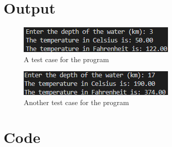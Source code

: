 \documentclass{article}
\begin{document}
\begin{flushleft}
  \section{Output}
  \begin{figure}[!h]
    \begin{centering}
      \includegraphics[scale=1]{Q2_output1.png}
      \caption{A test case for the program}
    \end{centering}
  \end{figure}
  \begin{figure}[!h]
    \begin{centering}
      \includegraphics[scale=1]{Q2_output2.png}
      \caption{Another test case for the program}
    \end{centering}
  \end{figure}
  \section{Code}
  
\end{flushleft}
\end{document}
